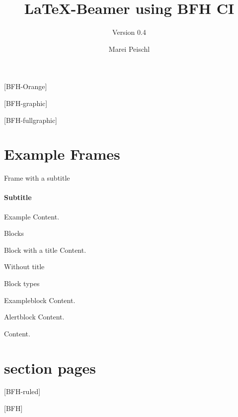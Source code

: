 \documentclass[
	ngerman,%
	authorontitle=true,
	]{bfhbeamer}
\title{\LaTeX-Beamer using BFH CI}
\subtitle{Version 0.4}
\author[M. Peischl]{Marei Peischl}
\institute{pei\TeX}
\begin{document}
\maketitle

[BFH-Orange]
\maketitle

[BFH-graphic]
\maketitle

[BFH-fullgraphic]
\maketitle

\section{Example Frames}

\begin{frame}{Frame with a subtitle}
	\framesubtitle{Subtitle}
	Example Content.
\end{frame}

\begin{frame}{Blocks}
	\begin{block}{Block with a title}
		Content.
	\end{block}
	\begin{block}{}
		Without title
	\end{block}
\end{frame}

\begin{frame}{Block types}
	\begin{exampleblock}{Exampleblock}
		Content.
	\end{exampleblock}
	\begin{alertblock}{Alertblock}
		Content.
	\end{alertblock}
	\begin{example}
		Content.
	\end{example}
\end{frame}

\section{section pages}

\frame{\sectionpage}

[BFH-ruled]

\frame{\sectionpage}



\frame{\sectionpage}

[BFH]

\frame{\sectionpage}
\end{document}
